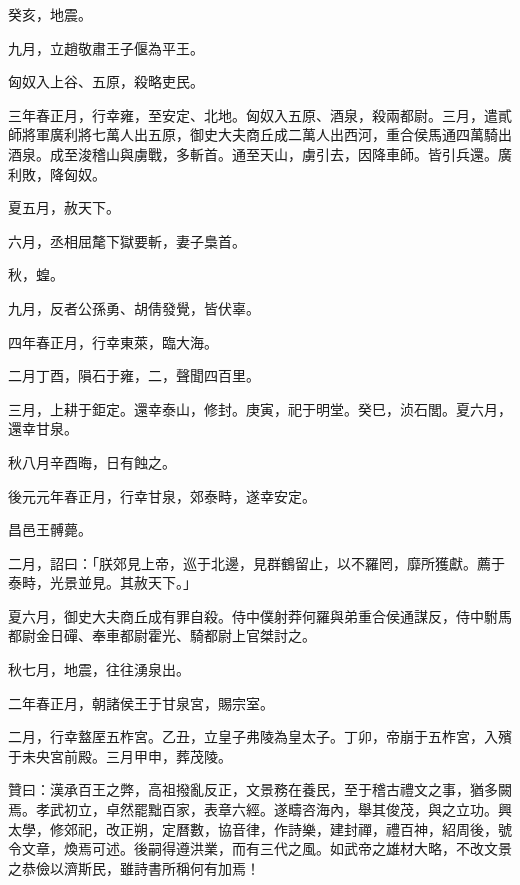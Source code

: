 \begin{pinyinscope}
癸亥，地震。

九月，立趙敬肅王子偃為平王。

匈奴入上谷、五原，殺略吏民。

三年春正月，行幸雍，至安定、北地。匈奴入五原、酒泉，殺兩都尉。三月，遣貳師將軍廣利將七萬人出五原，御史大夫商丘成二萬人出西河，重合侯馬通四萬騎出酒泉。成至浚稽山與虜戰，多斬首。通至天山，虜引去，因降車師。皆引兵還。廣利敗，降匈奴。

夏五月，赦天下。

六月，丞相屈氂下獄要斬，妻子梟首。

秋，蝗。

九月，反者公孫勇、胡倩發覺，皆伏辜。

四年春正月，行幸東萊，臨大海。

二月丁酉，隕石于雍，二，聲聞四百里。

三月，上耕于鉅定。還幸泰山，修封。庚寅，祀于明堂。癸巳，浈石閭。夏六月，還幸甘泉。

秋八月辛酉晦，日有蝕之。

後元元年春正月，行幸甘泉，郊泰畤，遂幸安定。

昌邑王髆薨。

二月，詔曰：「朕郊見上帝，巡于北邊，見群鶴留止，以不羅罔，靡所獲獻。薦于泰畤，光景並見。其赦天下。」

夏六月，御史大夫商丘成有罪自殺。侍中僕射莽何羅與弟重合侯通謀反，侍中駙馬都尉金日磾、奉車都尉霍光、騎都尉上官桀討之。

秋七月，地震，往往湧泉出。

二年春正月，朝諸侯王于甘泉宮，賜宗室。

二月，行幸盩厔五柞宮。乙丑，立皇子弗陵為皇太子。丁卯，帝崩于五柞宮，入殯于未央宮前殿。三月甲申，葬茂陵。

贊曰：漢承百王之弊，高祖撥亂反正，文景務在養民，至于稽古禮文之事，猶多闕焉。孝武初立，卓然罷黜百家，表章六經。遂疇咨海內，舉其俊茂，與之立功。興太學，修郊祀，改正朔，定曆數，協音律，作詩樂，建封禪，禮百神，紹周後，號令文章，煥焉可述。後嗣得遵洪業，而有三代之風。如武帝之雄材大略，不改文景之恭儉以濟斯民，雖詩書所稱何有加焉！


\end{pinyinscope}